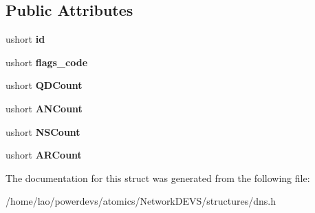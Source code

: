 \subsection*{Public Attributes}
\begin{DoxyCompactItemize}
\item 
ushort {\bfseries id}\hypertarget{structdns_1_1Header_a93db6477169afa0916eb97e18d0d414d}{}\label{structdns_1_1Header_a93db6477169afa0916eb97e18d0d414d}

\item 
ushort {\bfseries flags\+\_\+code}\hypertarget{structdns_1_1Header_afd9a0c9f79092a0baa8ad67d8f8cfcf5}{}\label{structdns_1_1Header_afd9a0c9f79092a0baa8ad67d8f8cfcf5}

\item 
ushort {\bfseries Q\+D\+Count}\hypertarget{structdns_1_1Header_ac4606baefe48fdda25fe00693426cac6}{}\label{structdns_1_1Header_ac4606baefe48fdda25fe00693426cac6}

\item 
ushort {\bfseries A\+N\+Count}\hypertarget{structdns_1_1Header_a47cd880532a4aaad40e32c2c2b10bf83}{}\label{structdns_1_1Header_a47cd880532a4aaad40e32c2c2b10bf83}

\item 
ushort {\bfseries N\+S\+Count}\hypertarget{structdns_1_1Header_ace802bcf38b0de507788d7fb5f4ca082}{}\label{structdns_1_1Header_ace802bcf38b0de507788d7fb5f4ca082}

\item 
ushort {\bfseries A\+R\+Count}\hypertarget{structdns_1_1Header_a7a209945d4c1fa015a4ecbfe618f11e5}{}\label{structdns_1_1Header_a7a209945d4c1fa015a4ecbfe618f11e5}

\end{DoxyCompactItemize}


The documentation for this struct was generated from the following file\+:\begin{DoxyCompactItemize}
\item 
/home/lao/powerdevs/atomics/\+Network\+D\+E\+V\+S/structures/dns.\+h\end{DoxyCompactItemize}
